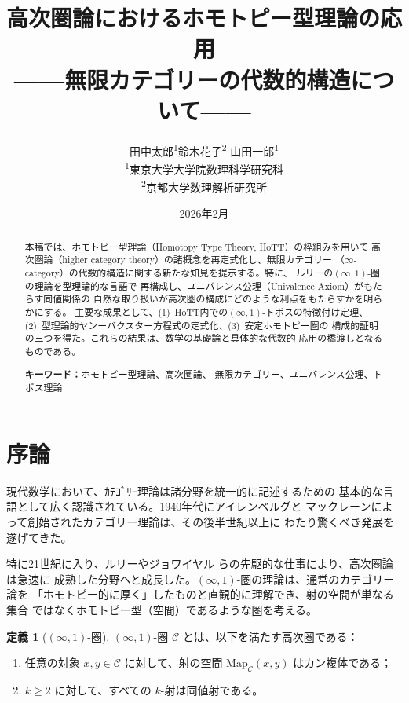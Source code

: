 \documentclass[12pt,a4paper]{article}
\title{高次圏論におけるホモトピー型理論の応用\\
  {\large ——無限カテゴリーの代数的構造について——}}
\author{田中太郎\textsuperscript{1}\quad 鈴木花子\textsuperscript{2}\quad
  山田一郎\textsuperscript{1}\\[6pt]
  \textsuperscript{1}東京大学大学院数理科学研究科\\
  \textsuperscript{2}京都大学数理解析研究所}
\date{2026年2月}
\theoremstyle{definition}
\newtheorem{definition}{定義}[section]
\begin{document}
\maketitle

\begin{abstract}
本稿では、ホモトピー型理論（Homotopy Type Theory, HoTT）の枠組みを用いて
高次圏論（higher category theory）の諸概念を再定式化し、無限カテゴリー
（$\infty$-category）の代数的構造に関する新たな知見を提示する。特に、
ルリーの$(\infty,1)$-圏の理論\cite{lurie2009htt}を型理論的な言語で
再構成し、ユニバレンス公理（Univalence Axiom）がもたらす同値関係の
自然な取り扱いが高次圏の構成にどのような利点をもたらすかを明らかにする。
主要な成果として、(1)~HoTT内での$(\infty,1)$-トポスの特徴付け定理、
(2)~型理論的ヤンーバクスター方程式の定式化、(3)~安定ホモトピー圏の
構成的証明の三つを得た。これらの結果は、数学の基礎論と具体的な代数的
応用の橋渡しとなるものである。

\medskip
\noindent\textbf{キーワード：}ホモトピー型理論、高次圏論、
無限カテゴリー、ユニバレンス公理、トポス理論
\end{abstract}


\section{序論}

現代数学において、ｶﾃｺﾞﾘｰ理論は諸分野を統一的に記述するための
基本的な言語として広く認識されている。1940年代にアイレンベルグと
マックレーンによって創始されたカテゴリー理論は、その後半世紀以上に
わたり驚くべき発展を遂げてきた。

特に21世紀に入り、ルリー\cite{lurie2009htt}やジョワイヤル
\cite{joyal2008theory}らの先駆的な仕事により、高次圏論は急速に
成熟した分野へと成長した。$(\infty,1)$-圏の理論は、通常のカテゴリー論を
「ホモトピー的に厚く」したものと直観的に理解でき、射の空間が単なる集合
ではなくホモトピー型（空間）であるような圏を考える。

\begin{definition}[$(\infty,1)$-圏]
$(\infty,1)$-圏 $\mathcal{C}$ とは、以下を満たす高次圏である：
\begin{enumerate}[label=(\roman*)]
  \item 任意の対象 $x, y \in \mathcal{C}$ に対して、射の空間
    $\mathrm{Map}_\mathcal{C}(x,y)$ はカン複体である；
  \item $k \geq 2$ に対して、すべての $k$-射は同値射である。
\end{enumerate}
\end{definition}
\end{document}
